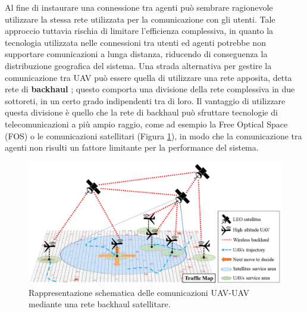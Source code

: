 Al fine di instaurare una connessione tra agenti può sembrare ragionevole utilizzare la stessa rete utilizzata per la comunicazione con gli utenti. 
Tale approccio tuttavia rischia di limitare l'efficienza complessiva, in quanto la tecnologia utilizzata nelle connessioni tra utenti ed agenti potrebbe non supportare comunicazioni a lunga distanza, riducendo di conseguenza la distribuzione geografica del sistema.
Una strada alternativa per gestire la comunicazione tra UAV può essere quella di utilizzare una rete apposita, detta rete di \textbf{backhaul} \cite{GuanYue2024CUTD}\cite{AlzenadMohamed2016FVBF}; questo comporta una divisione della rete complessiva in due sottoreti, in un certo grado indipendenti tra di loro.
Il vantaggio di utilizzare questa divisione è quello che la rete di backhaul può sfruttare tecnologie di telecomunicazioni a più ampio raggio, come ad esempio la Free Optical Space (FOS) \cite{8938182} o le comunicazioni satellitari \cite{HosseiniNozhan2020UCaC} (Figura \ref{fig:backhaul_example}), in modo che la comunicazione tra agenti non risulti un fattore limitante per la performance del sistema.
\begin{figure}[t]    
    \centering
    \includegraphics[width=1\textwidth]{img/ch1/satellite_backhaul_network_example.png}
    \caption[Comunicazioni UAV-to-UAV con backhaul satellitare]{Rappresentazione schematica delle comunicazioni UAV-UAV mediante una rete backhaul satellitare.}
    \label{fig:backhaul_example}
\end{figure}
